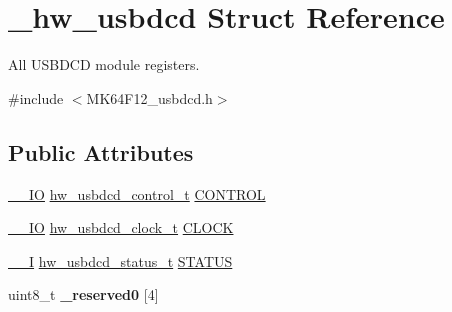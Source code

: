 \hypertarget{struct__hw__usbdcd}{}\section{\+\_\+hw\+\_\+usbdcd Struct Reference}
\label{struct__hw__usbdcd}


All U\+S\+B\+D\+CD module registers.  




{\ttfamily \#include $<$M\+K64\+F12\+\_\+usbdcd.\+h$>$}

\subsection*{Public Attributes}
\begin{DoxyCompactItemize}
\item 
\hyperlink{core__sc300_8h_aec43007d9998a0a0e01faede4133d6be}{\+\_\+\+\_\+\+IO} \hyperlink{union__hw__usbdcd__control}{hw\+\_\+usbdcd\+\_\+control\+\_\+t} \hyperlink{struct__hw__usbdcd_a511e70165ada6f6bce404f7e67b01eb3}{C\+O\+N\+T\+R\+OL}
\item 
\hyperlink{core__sc300_8h_aec43007d9998a0a0e01faede4133d6be}{\+\_\+\+\_\+\+IO} \hyperlink{union__hw__usbdcd__clock}{hw\+\_\+usbdcd\+\_\+clock\+\_\+t} \hyperlink{struct__hw__usbdcd_afd5f2fb1b08175e06933005876fb237c}{C\+L\+O\+CK}
\item 
\hyperlink{core__sc300_8h_af63697ed9952cc71e1225efe205f6cd3}{\+\_\+\+\_\+I} \hyperlink{union__hw__usbdcd__status}{hw\+\_\+usbdcd\+\_\+status\+\_\+t} \hyperlink{struct__hw__usbdcd_ae8291d0846f31f11fddd634ff490b87c}{S\+T\+A\+T\+US}
\item 
uint8\+\_\+t {\bfseries \+\_\+reserved0} \mbox{[}4\mbox{]}\hypertarget{struct__hw__usbdcd_a8568a2312935a9d220eb7f4ea2ff409f}{}\label{struct__hw__usbdcd_a8568a2312935a9d220eb7f4ea2ff409f}


\end{DoxyCompactItemize}
